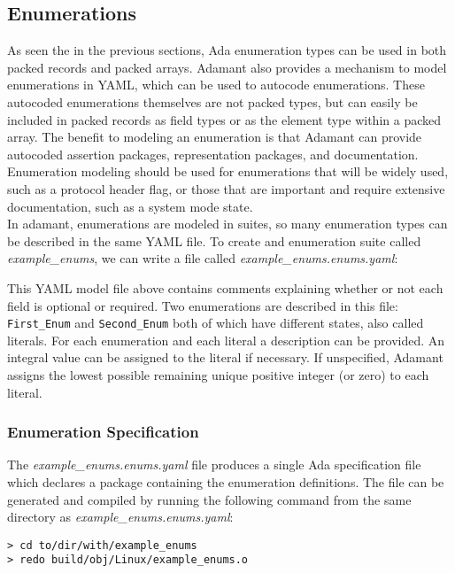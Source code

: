 \subsection{Enumerations}

As seen the in the previous sections, Ada enumeration types can be used in both packed records and packed arrays. Adamant also provides a mechanism to model enumerations in YAML, which can be used to autocode enumerations. These autocoded enumerations themselves are not packed types, but can easily be included in packed records as field types or as the element type within a packed array. The benefit to modeling an enumeration is that Adamant can provide autocoded assertion packages, representation packages, and documentation. Enumeration modeling should be used for enumerations that will be widely used, such as a protocol header flag, or those that are important and require extensive documentation, such as a system mode state. \\

In adamant, enumerations are modeled in suites, so many enumeration types can be described in the same YAML file. To create and enumeration suite called \textit{example\_enums}, we can write a file called \textit{example\_enums.enums.yaml}:


This YAML model file above contains comments explaining whether or not each field is optional or required. Two enumerations are described in this file: \texttt{First\_Enum} and \texttt{Second\_Enum} both of which have different states, also called literals. For each enumeration and each literal a description can be provided. An integral value can be assigned to the literal if necessary. If unspecified, Adamant assigns the lowest possible remaining unique positive integer (or zero) to each literal.

\subsubsection{Enumeration Specification}

The \textit{example\_enums.enums.yaml} file produces a single Ada specification file which declares a package containing the enumeration definitions. The file can be generated and compiled by running the following command from the same directory as \textit{example\_enums.enums.yaml}:

\vspace{5mm} %
\begin{verbatim}
> cd to/dir/with/example_enums
> redo build/obj/Linux/example_enums.o
\end{verbatim}
\vspace{5mm} %

